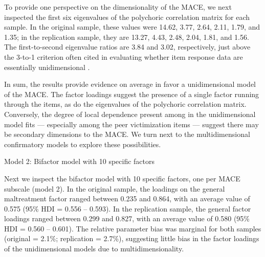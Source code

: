 \documentclass[letterpaper,man,natbib,floatsintext,longtable]{apa6}
\makeatletter
\renewcommand{\subsubsection}{\@startsection{subsubsection}{3}
  {\z@}%
  {\b@level@two@skip}{\e@level@two@skip}%
  {\normalfont\normalsize\bfseries}}
\makeatother
\begin{document}
To provide one perspective on the dimensionality of the MACE, we next inspected the first six eigenvalues of the polychoric correlation matrix for each sample. In the original sample, these values were 14.62, 3.77, 2.64, 2.11, 1.79, and 1.35; in the replication sample, they are 13.27, 4.43, 2.48, 2.04, 1.81, and 1.56. The first-to-second eigenvalue ratios are 3.84 and 3.02, respectively, just above the 3-to-1 criterion often cited in evaluating whether item response data are essentially unidimensional \citep{embretson2013item}. 

In sum, the results provide evidence on average in favor a unidimensional model of the MACE. The factor loadings suggest the presence of a single factor running through the items, as do the eigenvalues of the polychoric correlation matrix. Conversely, the degree of local dependence present among in the unidimensional model fits --- especially among the peer victimization items --- suggest there may be secondary dimensions to the MACE. We turn next to the multidimensional confirmatory models to explore these possibilities.

\subsubsection{Model 2: Bifactor model with 10 specific factors}

Next we inspect the bifactor model with 10 specific factors, one per MACE subscale (model 2). In the original sample, the loadings on the general maltreatment factor ranged between 0.235 and 0.864, with an average value of 0.575 (95\% HDI = 0.556 -- 0.593). In the replication sample, the general factor loadings ranged between 0.299 and 0.827, with an average value of 0.580 (95\% HDI = 0.560 -- 0.601). The relative parameter bias was marginal for both samples (original = 2.1\%; replication = 2.7\%), suggesting little bias in the factor loadings of the unidimensional models due to multidimensionality.  
\end{document}
